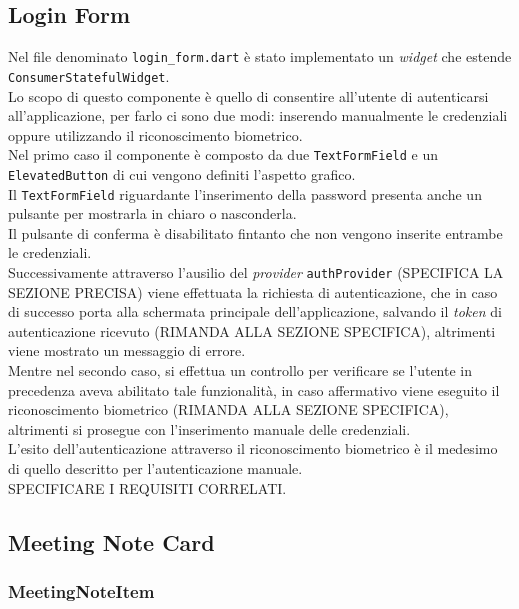 \subsection{Login Form}
\label{subsec:login-form}

Nel file denominato \lstinline{login_form.dart} è stato implementato un \emph{widget} che estende \lstinline{ConsumerStatefulWidget}.\\
Lo scopo di questo componente è quello di consentire all'utente di autenticarsi all'applicazione, per farlo ci sono due modi: inserendo manualmente le credenziali oppure utilizzando il riconoscimento biometrico.\\
Nel primo caso il componente è composto da due \lstinline{TextFormField}\cite{site:text-form-field} e un \lstinline{ElevatedButton}\cite{site:elevated-button} di cui vengono definiti l'aspetto grafico.\\
Il \lstinline{TextFormField} riguardante l'inserimento della password presenta anche un pulsante per mostrarla in chiaro o nasconderla.\\
Il pulsante di conferma è disabilitato fintanto che non vengono inserite entrambe le credenziali.\\
Successivamente attraverso l'ausilio del \emph{provider} \lstinline{authProvider} (SPECIFICA LA SEZIONE PRECISA) viene effettuata la richiesta di autenticazione, che in caso di successo porta alla schermata principale dell'applicazione, salvando il \emph{token} di autenticazione ricevuto (RIMANDA ALLA SEZIONE SPECIFICA), altrimenti viene mostrato un messaggio di errore.\\ 
Mentre nel secondo caso, si effettua un controllo per verificare se l'utente in precedenza aveva abilitato tale funzionalità, in caso affermativo viene eseguito il riconoscimento biometrico (RIMANDA ALLA SEZIONE SPECIFICA), altrimenti si prosegue con l'inserimento manuale delle credenziali.\\
L'esito dell'autenticazione attraverso il riconoscimento biometrico è il medesimo di quello descritto per l'autenticazione manuale.\\
SPECIFICARE I REQUISITI CORRELATI.

\subsection{Meeting Note Card}
\label{subsec:meeting-note-card}

\subsubsection*{MeetingNoteItem}
\label{subsubsec:meeting-note-item}

